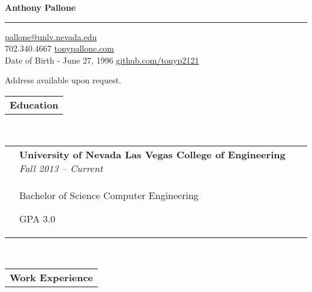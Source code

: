 \documentclass[12pt]{article}
\begin{document}
\begin{center}
\Huge {\bf Anthony Pallone}
\smallskip
\hrule
\medskip
\normalsize{\href{mailto:pallone@unlv.nevada.edu}{pallone@unlv.nevada.edu}} \\
\smallskip
\normalsize{702.340.4667 \hfill
\href{http://tonypallone.com/}{tonypallone.com}}
\\
\small Date of Birth - June 27, 1996 \hfill \normalsize \href{http://github.com/tonyp2121}{github.com/tonyp2121}
\\
\raggedright{\small Address available upon request. \hfill}
\end{center}  \medskip
\raggedright{\begin{tabular}[b]{p{5.5cm}}
	\bf{\Large{Education}} \\
    \cline{1-1}
\end{tabular}} \\ \smallskip \smallskip
\smallskip \smallskip
\begin{tabular}[b]{p{1.3cm} p{14.4cm} }
	& \small{\bf{University of Nevada Las Vegas College of Engineering}} \hfill \emph{\footnotesize{Fall 2013 -- Current}} \\
    & \begin{compactitem}
    	\small{\item Bachelor of Science Computer Engineering
    	\item GPA 3.0}
	\end{compactitem}

\end{tabular} \\ \medskip
\raggedright{\begin{tabular}[b]{p{5.5cm}}
	\bf{\Large{Work Experience}} \\
    \cline{1-1}
\end{tabular}} \\ \medskip \medskip
\end{document}
